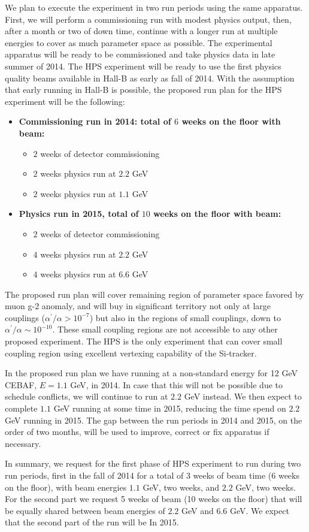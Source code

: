 We plan to execute the experiment in two run periods using the same apparatus. First, we will perform a commissioning run with modest physics output, then, after a month or two of down time, continue with a longer run at multiple energies to cover as much parameter space as possible. The experimental apparatus will be ready to be commissioned and take physics data in late summer of 2014. The HPS experiment will be ready to use the first physics quality beams available in Hall-B as early as fall of 2014. With the assumption that early running in Hall-B is possible, the proposed run plan for the HPS experiment will be the following: 

\begin{itemize}
\item {\bf Commissioning run in 2014: total of $6$ weeks on the floor with beam:}
\begin{itemize}
\item $2$ weeks of detector commissioning
\item $2$ weeks physics run at $2.2$ GeV
\item $2$ weeks physics run at $1.1$ GeV
\end{itemize}
\item{\bf Physics run in 2015, total of $10$ weeks on the floor with beam:}
\begin{itemize}
\item $2$ weeks of detector commissioning
\item $4$ weeks physics run at $2.2$ GeV
\item $4$ weeks physics run at $6.6$ GeV
\end{itemize}
\end{itemize}

The proposed run plan will cover remaining region of parameter space favored by muon \mbox{g-2} anomaly, and will buy in significant territory not only at large couplings ($\alpha^\prime/\alpha>10^{-7}$) but also in the regions of small couplings, down to $\alpha^\prime/\alpha\sim 10^{-10}$. These small coupling regions are not accessible to any other proposed experiment. The HPS is the only experiment that can cover small coupling region using excellent vertexing capability of the Si-tracker. 

In the proposed run plan we have running at a non-standard energy for 12 GeV CEBAF, $E=1.1$ GeV, in 2014. In case that this will not be possible due to schedule conflicts, we will continue to run at $2.2$ GeV instead. We then expect to complete $1.1$ GeV running at some time in 2015, reducing the time spend on $2.2$ GeV running in 2015. The gap between the run periods in 2014 and 2015, on the order of two months, will be used to improve, correct or fix apparatus if necessary.

In summary, we request for the first phase of HPS experiment to run during two run periods, first in the fall of 2014 for a total of 3 weeks of beam time (6 weeks on the floor), with beam energies $1.1$ GeV, two weeks, and $2.2$ GeV, two weeks. For the second part we request 5 weeks of beam (10 weeks on the floor) that will be equally shared between beam energies of $2.2$ GeV and $6.6$ GeV. We expect that the second part of the run will be In 2015.   

